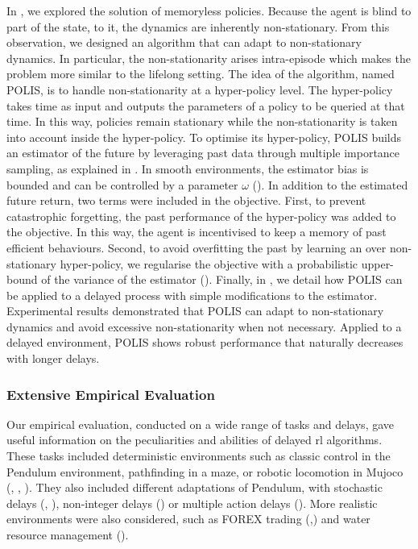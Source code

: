 In , we explored the solution of memoryless policies.
Because the agent is blind to part of the state, to it, the dynamics are inherently non-stationary.
From this observation, we designed an algorithm that can adapt to non-stationary dynamics.
In particular, the non-stationarity arises intra-episode which makes the problem more similar to the lifelong setting.
The idea of the algorithm, named POLIS, is to handle non-stationarity at a hyper-policy level. 
The hyper-policy takes time as input and outputs the parameters of a policy to be queried at that time. 
In this way, policies remain stationary while the non-stationarity is taken into account inside the hyper-policy.
To optimise its hyper-policy, POLIS builds an estimator of the future by leveraging past data through multiple importance sampling, as explained in .
In smooth environments, the estimator bias is bounded and can be controlled by a parameter $\omega$ ().
In addition to the estimated future return, two terms were included in the objective.
First, to prevent catastrophic forgetting, the past performance of the hyper-policy was added to the objective.
In this way, the agent is incentivised to keep a memory of past efficient behaviours.
Second, to avoid overfitting the past by learning an over non-stationary hyper-policy, we regularise the objective with a probabilistic upper-bound of the variance of the estimator ().
Finally, in , we detail how POLIS can be applied to a delayed process with simple modifications to the estimator.
Experimental results demonstrated that POLIS can adapt to non-stationary dynamics and avoid excessive non-stationarity when not necessary.
Applied to a delayed environment, POLIS shows robust performance that naturally decreases with longer delays.

\subsubsection{Extensive Empirical Evaluation}
Our empirical evaluation, conducted on a wide range of tasks and delays, gave useful information on the peculiarities and abilities of delayed \gls{rl} algorithms.
These tasks included deterministic environments such as classic control in the Pendulum environment, pathfinding in a maze, or robotic locomotion in Mujoco (, , ).
They also included different adaptations of Pendulum, with stochastic delays (, ), non-integer delays () or multiple action delays ().
More realistic environments were also considered, such as FOREX trading (,) and water resource management ().

